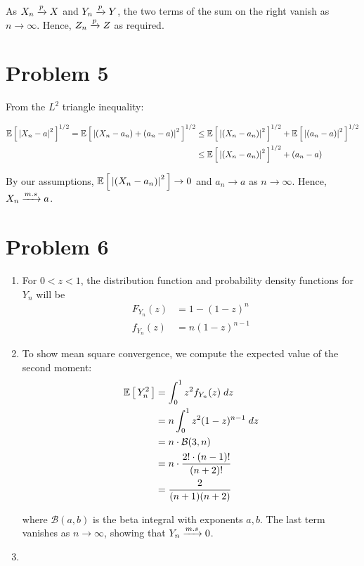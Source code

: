 \documentclass[12pt]{article}%
\begin{document}
As $X_n \xrightarrow[]{p} X$ and $Y_n \xrightarrow[]{p} Y$, the two terms of the sum on the right vanish as $n \rightarrow \infty$. Hence, $Z_n \xrightarrow[]{p} Z$ as required.

\section{Problem 5}
From the $L^2$ triangle inequality:

\begin{align*}
\mathbb{E}\left[\,\abs{X_n - a}^2\,\right]^{1/2} = \mathbb{E}\left[\,\abs{(X_n - a_n) + (a_n - a)}^2\,\right]^{1/2} & \leq \mathbb{E}\left[\,\abs{(X_n - a_n)}^2\,\right]^{1/2} + \mathbb{E}\left[\,\abs{(a_n - a)}^2\,\right]^{1/2} \\
& \leq \mathbb{E}\left[\,\abs{(X_n - a_n)}^2\,\right]^{1/2} + (a_n - a)
\end{align*}

By our assumptions, $\mathbb{E}\left[\,\abs{(X_n - a_n)}^2\,\right] \rightarrow 0$ and $a_n \rightarrow a$ as $n \rightarrow \infty$. Hence, $X_n \xrightarrow[]{m.s} a$.

\section{Problem 6}

\begin{enumerate}
  \item For $0 < z < 1$, the distribution function and probability density functions for $Y_n$ will be
  \begin{align*}
      F_{Y_n}(z) & = 1 - (1-z)^n \\
      f_{Y_n}(z) & = n(1-z)^{n-1}
  \end{align*}

  \item
  To show mean square convergence, we compute the expected value of the second moment:
  \begin{align*}
      \mathbb{E}\left[\,Y_n^2\,\right] & = \int_0^1 z^2 f_{Y_n}(z) \; dz \\
      & = n \int_0^1 z^2(1-z)^{n-1} \; dz \\
      & = n \cdot \mathcal{B}(3,n) \\
      & = n \cdot \frac{2!\cdot(n-1)!}{(n+2)!} \\
      & = \frac{2}{(n+1)(n+2)}
  \end{align*}

  where $\mathcal{B}(a,b)$ is the beta integral with exponents $a,b$. The last term vanishes as $n \rightarrow \infty$, showing that $Y_n \xrightarrow[]{m.s} 0$.

  \item
\end{enumerate}
\end{document}
